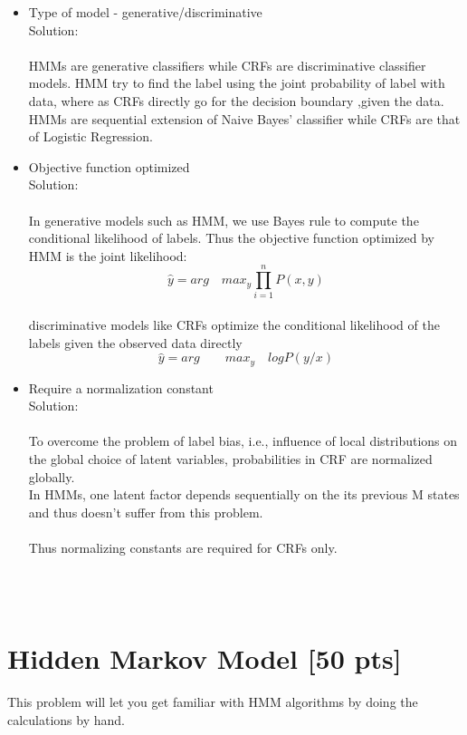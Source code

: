 \documentclass[twoside,11pt]{article}\usepackage{amsmath,amsfonts,amsthm,fullpage}
\begin{document}
\begin{itemize}
  \item Type of model - generative/discriminative
  \\ Solution: \\\\
  HMMs are generative classifiers while CRFs are discriminative classifier models. HMM try to find the label using the joint probability of label with data, where as CRFs directly go for the decision boundary ,given the data. HMMs are sequential extension of Naive Bayes' classifier while CRFs are that of Logistic Regression.
  \item Objective function optimized
  \\Solution:\\\\
  In generative models such as HMM, we use Bayes rule to compute the conditional likelihood of labels. Thus the objective function optimized by HMM is the joint likelihood:
\begin{equation}
\hat{y}  = arg \quad max_{y} \prod_{i=1}^n P(x,y)
  \end{equation}
\\discriminative models like CRFs optimize the conditional likelihood of the labels given the observed data directly
\begin{equation}
\hat{y} = arg \qquad max_{y} \quad log P(y/x)
\end{equation}
  \item Require a normalization constant
  \\ Solution: \\\\
To overcome the problem of label bias, i.e., influence of local distributions on the global choice of latent variables, probabilities in CRF are normalized globally. 
\\ In HMMs, one latent factor depends sequentially on the its previous M states and thus doesn't suffer from this problem. 
\\\\ Thus normalizing constants are required for CRFs only.
\end{itemize}
~\\~\\

\section{Hidden Markov Model [50 pts]}

This problem will let you get familiar with HMM algorithms by doing
the calculations by hand.
\end{document}
